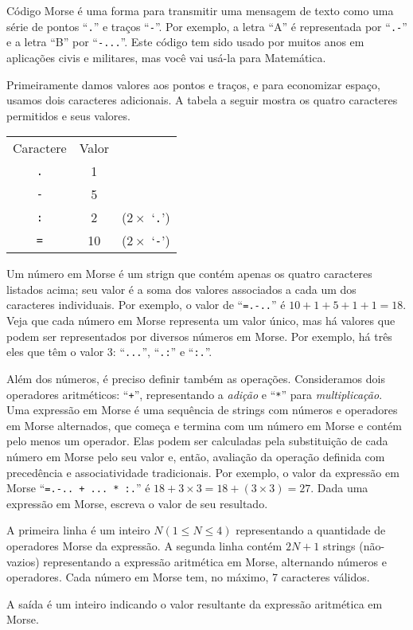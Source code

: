%
\Conceitos{}%
%

Código Morse é uma forma para transmitir uma mensagem de texto como uma série de pontos ``\texttt{.}'' e traços ``\texttt{-}''. Por exemplo, a letra ``A'' é representada por ``\texttt{.-}'' e a letra ``B'' por ``\texttt{-...}''. Este código tem sido usado por muitos anos em aplicações civis e militares, mas você vai usá-la para Matemática.

Primeiramente damos valores aos pontos e traços, e para economizar espaço, usamos dois caracteres adicionais. A tabela a seguir mostra os quatro caracteres permitidos e seus valores.

\begin{center}%
	\begin{tabular}{c | c l}%
	Caractere  & Valor & \\\cline{1-2}%
	\texttt{.} & 1     & \\%
	\texttt{-} & 5     & \\%
	\texttt{:} & 2     & ($2\times$ `\texttt{.}')\\%
	\texttt{=} & 10    & ($2\times$ `\texttt{-}')%
	\end{tabular}
\end{center}%

Um número em Morse é um strign que contém apenas os quatro caracteres listados acima; seu valor é a soma dos valores associados a cada um dos caracteres individuais. Por exemplo, o valor de \mbox{``\texttt{=.-..}''} é \mbox{$10+1+5+1+1 = 18$}. Veja que cada número em Morse representa um valor único, mas há valores que podem ser representados por diversos números em Morse. Por exemplo, há três eles que têm o valor 3: ``\texttt{...}'', ``\texttt{.:}'' e ``\texttt{:.}''.

Além dos números, é preciso definir também as operações. Consideramos dois operadores aritméticos:  ``\texttt{+}'', representando a \emph{adição} e ``\texttt{*}'' para \emph{multiplicação}. Uma expressão em Morse é uma sequência de strings com números e operadores em Morse alternados, que começa e termina com um número em Morse e contém pelo menos um operador. Elas podem ser calculadas pela substituição de cada número em Morse pelo seu valor e, então, avaliação da operação definida com precedência e associatividade tradicionais. Por exemplo, o valor da expressão em Morse  ``\texttt{=.-.. + ... * :.}'' é \mbox{$18 + 3 \times 3 = 18 + (3 \times 3) = 27$}. Dada uma expressão em Morse, escreva o valor de seu resultado.


\Entrada%
A primeira linha é um inteiro $N (1 \leq N \leq 4)$ representando a quantidade de operadores Morse da expressão. A segunda linha contém $2N + 1$ strings (não-vazios) representando a expressão aritmética em Morse, alternando números e operadores. Cada número em Morse tem, no máximo, 7 caracteres válidos.

\Saida%
A saída é um inteiro indicando o valor resultante da expressão aritmética em Morse.

%
